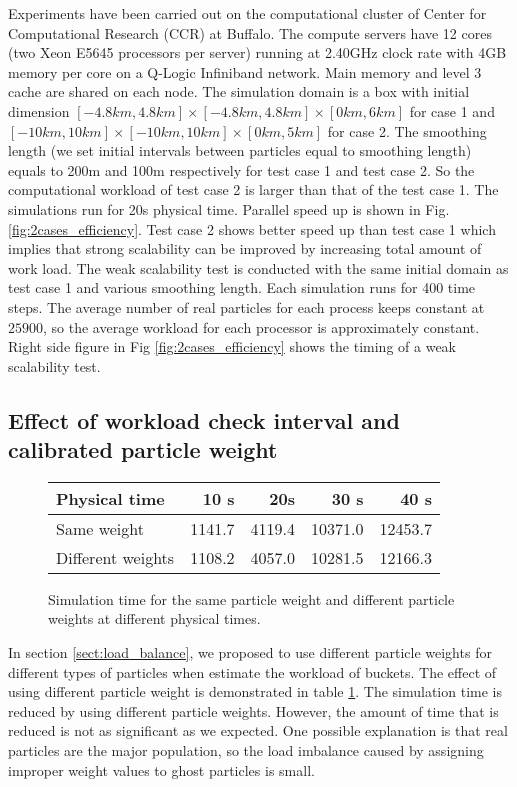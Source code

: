 Experiments have been carried out on the computational cluster of Center for Computational Research (CCR) at Buffalo. 
The compute servers have 12 cores (two Xeon E5645 processors per server) running at 2.40GHz clock rate with 4GB memory per core on a Q-Logic Infiniband network. Main memory and level 3 cache are shared on each node. The simulation domain is a box with initial dimension $[-4.8km, 4.8km]\times [-4.8km, 4.8km] \times [0km, 6km]$ for case 1 and $[-10km, 10km]\times [-10km, 10km] \times [0km, 5km]$ for case 2. The smoothing length (we set initial intervals between particles equal to smoothing length) equals to 200m and 100m respectively for test case 1 and test case 2. So the computational workload of test case 2 is larger than that of the test case 1. The simulations run for 20s physical time.  Parallel speed up is shown in Fig. \ref{fig:2cases_efficiency}. Test case 2 shows better speed up than test case 1 which implies that strong scalability can be improved by increasing total amount of work load.
The weak scalability test is conducted with the same initial domain as test case 1 and various smoothing length. Each simulation runs for 400 time steps. The average number of real particles for each process keeps constant at $25900$, so the average workload for each processor is approximately constant. 
Right side figure in Fig \ref{fig:2cases_efficiency} shows the timing of a weak scalability test.

\subsection{Effect of workload check interval and calibrated particle weight} \label{sec:effect-of-workload-check-interval}
\begin{figure}
\centering
{	  
	  \begin{tabular}{lrrrr}
	    \hline
	    Physical time & 10 s & 20s & 30 s & 40 s \\
	    \hline
	    Same weight & 1141.7 & 4119.4 & 10371.0 & 12453.7\\
	    Different weights & 1108.2 & 4057.0 & 10281.5 & 12166.3\\
	    \hline
	  \end{tabular}
}
{\caption{Simulation time for the same particle weight and different particle weights at different physical times.}}
\label{tab:same_diff_particle_weight}
\end{figure}
In section \ref{sect:load_balance}, we proposed to use different particle weights for different types of particles when estimate the workload of buckets. The effect of using different particle weight is demonstrated in table \ref{tab:same_diff_particle_weight}. The simulation time is reduced by using different particle weights. However, the amount of time that is reduced is not as significant as we expected. One possible explanation is that real particles are the major population, so the load imbalance caused by assigning improper weight values to ghost particles is small.

